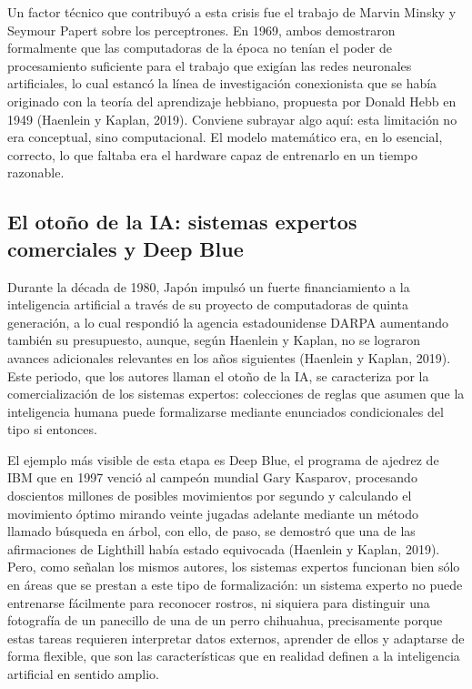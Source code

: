 \documentclass[12pt,letterpaper]{article}
\begin{document}
Un factor t\'ecnico que contribuy\'o a esta crisis fue el trabajo de Marvin Minsky y Seymour Papert sobre los perceptrones. En 1969, ambos demostraron formalmente que las computadoras de la \'epoca no ten\'ian el poder de procesamiento suficiente para el trabajo que exig\'ian las redes neuronales artificiales, lo cual estanc\'o la l\'inea de investigaci\'on conexionista que se hab\'ia originado con la teor\'ia del aprendizaje hebbiano, propuesta por Donald Hebb en 1949 (Haenlein y Kaplan, 2019). Conviene subrayar algo aqu\'i: esta limitaci\'on no era conceptual, sino computacional. El modelo matem\'atico era, en lo esencial, correcto, lo que faltaba era el hardware capaz de entrenarlo en un tiempo razonable.

\subsection{El oto\~no de la IA: sistemas expertos comerciales y Deep Blue}

Durante la d\'ecada de 1980, Jap\'on impuls\'o un fuerte financiamiento a la inteligencia artificial a trav\'es de su proyecto de computadoras de quinta generaci\'on, a lo cual respondi\'o la agencia estadounidense DARPA aumentando tambi\'en su presupuesto, aunque, seg\'un Haenlein y Kaplan, no se lograron avances adicionales relevantes en los a\~nos siguientes (Haenlein y Kaplan, 2019). Este periodo, que los autores llaman el oto\~no de la IA, se caracteriza por la comercializaci\'on de los sistemas expertos: colecciones de reglas que asumen que la inteligencia humana puede formalizarse mediante enunciados condicionales del tipo si entonces.

El ejemplo m\'as visible de esta etapa es Deep Blue, el programa de ajedrez de IBM que en 1997 venci\'o al campe\'on mundial Gary Kasparov, procesando doscientos millones de posibles movimientos por segundo y calculando el movimiento \'optimo mirando veinte jugadas adelante mediante un m\'etodo llamado b\'usqueda en \'arbol, con ello, de paso, se demostr\'o que una de las afirmaciones de Lighthill hab\'ia estado equivocada (Haenlein y Kaplan, 2019). Pero, como se\~nalan los mismos autores, los sistemas expertos funcionan bien s\'olo en \'areas que se prestan a este tipo de formalizaci\'on: un sistema experto no puede entrenarse f\'acilmente para reconocer rostros, ni siquiera para distinguir una fotograf\'ia de un panecillo de una de un perro chihuahua, precisamente porque estas tareas requieren interpretar datos externos, aprender de ellos y adaptarse de forma flexible, que son las caracter\'isticas que en realidad definen a la inteligencia artificial en sentido amplio.
\end{document}
